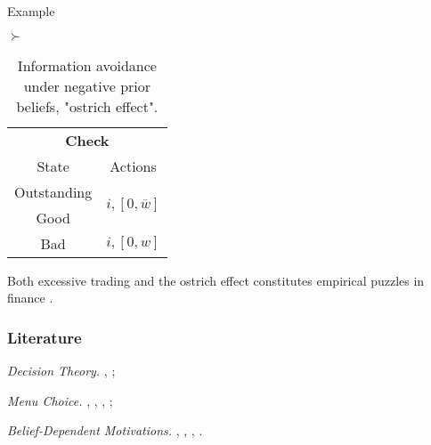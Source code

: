\documentclass[usenames,dvipsnames,aspectratio=169,11pt, envcountsect]{beamer}
\begin{document}
\begin{frame}[noframenumbering]{Example}
\begin{table}[H]
		\( \succ \) %
		\begin{minipage}{0.29\textwidth}
			\centering
			\begin{tabular}{c | c}
				\multicolumn{2}{c}{\textbf{Check}}                                                                                 \\
				State                             & Actions                                                                        \\
				\hline
				{\color{bleudefrance}Outstanding} & \multirow{2}{*}{{\color{bleudefrance}\( i, \left[ 0, \overline{w} \right] \)}} \\
				{\color{bleudefrance}Good}        &                                                                                \\
				Bad                               & \(  i, \left[0, w \right] \)                                                   \\
			\end{tabular}
			\vspace{0.5cm} %
		\end{minipage}
		\caption{Information avoidance under negative prior beliefs, "ostrich effect".} %
		\label{tab:oistrich}
	\end{table}

	Both excessive trading and the ostrich effect constitutes empirical puzzles in finance \citep{danielOverconfidentInvestorsPredictable2015,golmanInformationAvoidance2017}.

\end{frame}

\begin{frame}\frametitle{Literature}

	\begin{wideitemize}
		\item \textit{Decision Theory.} \cite{liangInformationdependentExpectedUtility2017}, \cite{dillenbergerAdditivebeliefbasedPreferences2020} \cite{rommeswinkelPreferenceKnowledge2023};
		\item \textit{Menu Choice.} \cite{gulTemptationSelfControl2001}, \cite{ozdenorenCompletingStateSpace2002}, \cite{epsteinAxiomaticModelNonBayesian2006}, \cite{epsteinColdFeet2007};
		\item \textit{Belief-Dependent Motivations.} \cite{eliazCanAnticipatoryFeelings2006}, \cite{benabou2016mindful}, \cite{golmanInformationAvoidance2017}, \cite{battigalliBeliefdependentMotivationsPsychological2022}.
	\end{wideitemize}

\end{frame}
\end{document}
